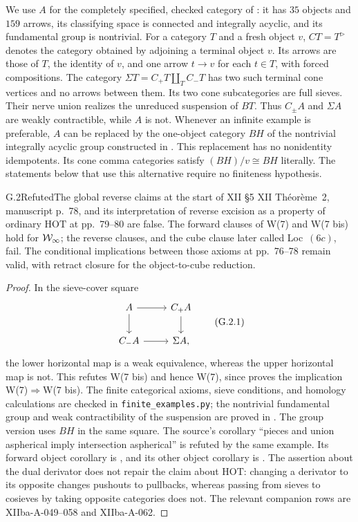 We use $A$ for the completely specified, checked category of : it has $35$ objects and $159$ arrows, its classifying space is connected and integrally acyclic, and its fundamental group is nontrivial. For a category $T$ and a fresh object $v$, $CT=T^{\triangleright}$ denotes the category obtained by adjoining a terminal object $v$. Its arrows are those of $T$, the identity of $v$, and one arrow $t\to v$ for each $t\in T$, with forced compositions. The category $\Sigma T=C_+T\amalg_T C_-T$ has two such terminal cone vertices and no arrows between them. Its two cone subcategories are full sieves. Their nerve union realizes the unreduced suspension of $BT$. Thus $C_\pm A$ and $\Sigma A$ are weakly contractible, while $A$ is not. Whenever an infinite example is preferable, $A$ can be replaced by the one-object category $BH$ of the nontrivial integrally acyclic group constructed in . This replacement has no nonidentity idempotents. Its cone comma categories satisfy $(BH)/v\cong BH$ literally. The statements below that use this alternative require no finiteness hypothesis.

\begin{claim}{G.2}{Refuted}{The global reverse claims at the start of XII \S5}
XII Th\'eor\`eme~2, manuscript p.~78, and its interpretation of reverse excision as a property of ordinary $\mathrm{HOT}$ at pp.~79--80 are false. The forward clauses of W(7) and W(7 bis) hold for $\mathcal{W}_{\infty}$; the reverse clauses, and the cube clause later called Loc~$(6c)$, fail. The conditional implications between those axioms at pp.~76--78 remain valid, with retract closure for the object-to-cube reduction.
\end{claim}
\begin{proof}
In the sieve-cover square
\[
\begin{tikzcd}
A\ar[r]\ar[d]&C_+A\ar[d]\\
C_-A\ar[r]&\Sigma A,
\end{tikzcd}                                                   \tag{G.2.1}
\]
the lower horizontal map is a weak equivalence, whereas the upper horizontal map is not. This refutes W(7 bis) and hence W(7), since  proves the implication W(7)$\Rightarrow$W(7 bis). The finite categorical axioms, sieve conditions, and homology calculations are checked in \texttt{finite\_examples.py}; the nontrivial fundamental group and weak contractibility of the suspension are proved in . The group version uses $BH$ in the same square. The source's corollary ``pieces and union aspherical imply intersection aspherical'' is refuted by the same example. Its forward object corollary is , and its other object corollary is . The assertion about the dual derivator does not repair the claim about $\mathrm{HOT}$: changing a derivator to its opposite changes pushouts to pullbacks, whereas passing from sieves to cosieves by taking opposite categories does not. The relevant companion rows are XIIba-A-049--058 and XIIba-A-062.
\end{proof}

